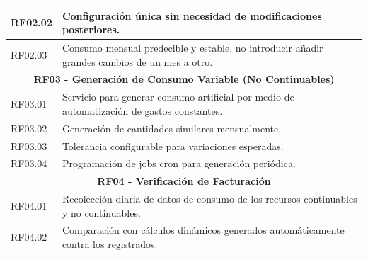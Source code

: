 \begin{table}[htbp]
\begin{tabular}{|p{}|p{}|}
        \hline
        RF02.02    & Configuración única sin necesidad de modificaciones posteriores.                                                                                                                     \\
        \hline
        RF02.03    & Consumo mensual predecible y estable, no introducir añadir grandes cambios de un mes a otro.                                                                                                                 \\
        \hline
        \multicolumn{2}{|c|}{\textbf{RF03 - Generación de Consumo Variable (No Continuables)}}                                                                                                            \\
        \hline
        RF03.01    & Servicio para generar consumo artificial por medio de automatización de gastos constantes.                                                                                                                                            \\
        \hline
        RF03.02    & Generación de cantidades similares mensualmente.                                                                                                                                     \\
        \hline
        RF03.03    & Tolerancia configurable para variaciones esperadas.                                                                                                                                  \\
        \hline
        RF03.04    & Programación de jobs cron para generación periódica.                                                                                                                                 \\
        \hline
        \multicolumn{2}{|c|}{\textbf{RF04 - Verificación de Facturación}}                                                                                                                                 \\
        \hline
        RF04.01    & Recolección diaria de datos de consumo de los recursos continuables y no continuables.                                                                                                                                              \\
        \hline
        RF04.02    & Comparación con cálculos dinámicos generados automáticamente contra los registrados.                                                                                                                        \\

\end{tabular}
\end{table}
